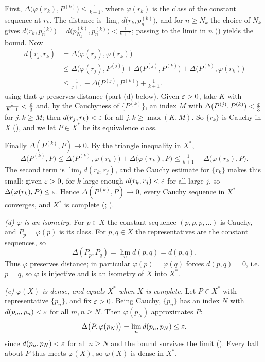 \documentclass[main.tex]{subfiles}
\begin{document}
\begin{SolutionBlue}
First, $\Delta\bigl(\varphi(r_k),P^{(k)}\bigr)\le\tfrac{1}{k+1}$, where $\varphi(r_k)$ is the class of
the constant sequence at $r_k$. The distance is $\lim_n d\bigl(r_k,p^{(k)}_n\bigr)$, and for $n\ge N_k$
the choice of $N_k$ gives $d\bigl(r_k,p^{(k)}_n\bigr)=d\bigl(p^{(k)}_{N_k},p^{(k)}_n\bigr)<\tfrac1{k+1}$;
passing to the limit in $n$ () yields the bound. Now
\[
\begin{aligned}
d(r_j,r_k)&=\Delta\bigl(\varphi(r_j),\varphi(r_k)\bigr)\\
&\le\Delta\bigl(\varphi(r_j),P^{(j)}\bigr)+\Delta\bigl(P^{(j)},P^{(k)}\bigr)+\Delta\bigl(P^{(k)},\varphi(r_k)\bigr)\\
&\le\tfrac1{j+1}+\Delta\bigl(P^{(j)},P^{(k)}\bigr)+\tfrac1{k+1}.
\end{aligned}
\]
using that $\varphi$ preserves distance (part (d) below). Given $\varepsilon>0$, take $K$ with
$\tfrac1{K+1}<\tfrac{\varepsilon}3$ and, by the Cauchyness of $\{P^{(k)}\}$, an index $M$ with
$\Delta(P^{(j)},P^{(k)})<\tfrac{\varepsilon}3$ for $j,k\ge M$; then $d(r_j,r_k)<\varepsilon$ for all $j,k\ge\max(K,M)$.
So $\{r_k\}$ is Cauchy in $X$ (), and we let $P\in X^*$ be its equivalence class.

Finally $\Delta(P^{(k)},P)\to 0$. By the triangle inequality in $X^*$,
\[
\Delta\bigl(P^{(k)},P\bigr)\le\Delta\bigl(P^{(k)},\varphi(r_k)\bigr)+\Delta\bigl(\varphi(r_k),P\bigr)
\le\tfrac1{k+1}+\Delta\bigl(\varphi(r_k),P\bigr).
\]
The second term is $\lim_j d(r_k,r_j)$, and the Cauchy estimate for $\{r_k\}$ makes this small: given
$\varepsilon>0$, for $k$ large enough $d(r_k,r_j)<\varepsilon$ for all large $j$, so $\Delta(\varphi(r_k),P)\le\varepsilon$.
Hence $\Delta(P^{(k)},P)\to 0$, every Cauchy sequence in $X^*$ converges, and $X^*$ is complete
(; ).

\emph{(d) $\varphi$ is an isometry.} For $p\in X$ the constant sequence $(p,p,p,\dots)$ is Cauchy, and
$P_p=\varphi(p)$ is its class. For $p,q\in X$ the representatives are the constant sequences, so
\[
\Delta(P_p,P_q)=\lim_n d(p,q)=d(p,q).
\]
Thus $\varphi$ preserves distance; in particular $\varphi(p)=\varphi(q)$ forces $d(p,q)=0$, i.e.\
$p=q$, so $\varphi$ is injective and is an isometry of $X$ into $X^*$.

\emph{(e) $\varphi(X)$ is dense, and equals $X^*$ when $X$ is complete.} Let $P\in X^*$ with
representative $\{p_n\}$, and fix $\varepsilon>0$. Being Cauchy, $\{p_n\}$ has an index $N$ with
$d(p_m,p_n)<\varepsilon$ for all $m,n\ge N$. Then $\varphi(p_N)$ approximates $P$:
\[
\Delta\bigl(P,\varphi(p_N)\bigr)=\lim_n d(p_n,p_N)\le\varepsilon,
\]
since $d(p_n,p_N)<\varepsilon$ for all $n\ge N$ and the bound survives the limit (). Every ball
about $P$ thus meets $\varphi(X)$, so $\varphi(X)$ is dense in $X^*$.


\end{SolutionBlue}
\end{document}
